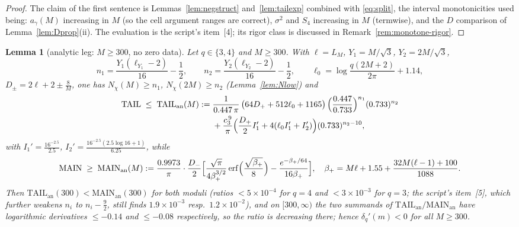 \documentclass[11pt]{article}
\newtheorem{lemma}{Lemma}
\begin{document}
\begin{proof}
The claim of the first sentence is
Lemmas~\ref{lem:negstruct} and~\ref{lem:tailexp} combined with
\eqref{eq:split}, the interval monotonicities used being: $a_\gamma(M)$
increasing in $M$ (so the cell argument ranges are correct),
$\sigma^2$ and $S_4$ increasing in $M$ (termwise), and the $D$
comparison of Lemma~\ref{lem:Dprop}(ii). The evaluation is the
script's item~[4]; its rigor class is discussed in
Remark~\ref{rem:monotone-rigor}.
\end{proof}

\begin{lemma}[analytic leg: $M\ge300$, no zero data]
\label{lem:analytic-leg}
Let $q\in\{3,4\}$ and $M\ge300$. With $\ell=L_M$,
$Y_1=M/\sqrt3$, $Y_2=2M/\sqrt3$,
\[
n_1=\frac{Y_1(\ell_{Y_1}-2)}{16}-\frac12,\qquad
n_2=\frac{Y_2(\ell_{Y_2}-2)}{16}-\frac12,\qquad
\ell_0=\log\frac{q(2M+2)}{2\pi}+1.14,
\]
$D_{\pm}=2\ell+2\pm\tfrac8M$, one has $N_\chi(M)\ge n_1$,
$N_\chi(2M)\ge n_2$ (Lemma~\ref{lem:Nlow}) and
\begin{align*}
\mathrm{TAIL}\;\le\;\mathrm{TAIL}_{\mathrm{an}}(M)
:=\;&\frac{1}{0.447\,\pi}\,
\bigl(64D_++512\ell_0+1165\bigr)\,
\Bigl(\frac{0.447}{0.733}\Bigr)^{n_1}(0.733)^{n_2}\\
&+\frac{c_3^{\,9}}\pi\Bigl(\frac{D_+}2I_1'+4(\ell_0I_1'+I_2')\Bigr)
(0.733)^{n_2-10},
\end{align*}
with $I_1'=\tfrac{16^{-2.5}}{2.5}$,
$I_2'=\tfrac{16^{-2.5}(2.5\log16+1)}{6.25}$, while
\[
\mathrm{MAIN}\;\ge\;\mathrm{MAIN}_{\mathrm{an}}(M)
:=\frac{0.9973}\pi\cdot\frac{D_-}2
\Bigl[\frac{\sqrt\pi}{4\beta_+^{3/2}}
\operatorname{erf}\Bigl(\frac{\sqrt{\beta_+}}8\Bigr)
-\frac{e^{-\beta_+/64}}{16\beta_+}\Bigr],
\quad
\beta_+=M\ell+1.55+\frac{32M(\ell-1)+100}{1088}.
\]
Then $\mathrm{TAIL}_{\mathrm{an}}(300)<
\mathrm{MAIN}_{\mathrm{an}}(300)$ for both moduli (ratios
$<5\times10^{-4}$ for $q=4$ and $<3\times10^{-3}$ for $q=3$; the
script's item~[5], which further weakens $n_i$ to $n_i-\tfrac92$,
still finds $1.9\times10^{-3}$ resp.\ $1.2\times10^{-2}$), and on
$[300,\infty)$ the two summands of
$\mathrm{TAIL}_{\mathrm{an}}/\mathrm{MAIN}_{\mathrm{an}}$ have
logarithmic derivatives $\le-0.14$ and $\le-0.08$ respectively, so
the ratio is decreasing there; hence
$\delta_q'(m)<0$ for all $M\ge300$.
\end{lemma}
\end{document}
